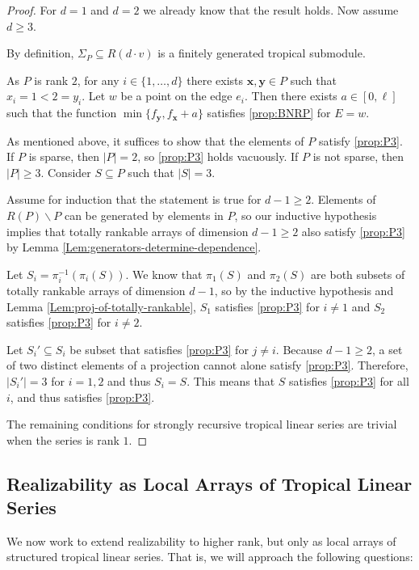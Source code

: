 \documentclass{amsart}
\begin{document}
	\begin{proof}
		For $d=1$ and $d=2$ we already know that the result holds. Now assume $d \geq 3$.
		
		By definition, $\Sigma_P \subseteq R(d \cdot v)$ is a finitely generated tropical submodule. 
		
		As $P$ is rank $2$, for any $i \in \{ 1, \ldots, d \}$ there exists $\mathbf{x}, \mathbf{y} \in P$ such that $x_i = 1 < 2 = y_i$. Let $w$ be a point on the edge $e_i$. Then there exists $a \in [0, \ell]$ such that the function $\min \{ f_{\mathbf{y}}, f_{\mathbf{x}} + a \}$ satisfies \ref{prop:BNRP} for $E = w$.
		
		As mentioned above, it suffices to show that the elements of $P$ satisfy \ref{prop:P3}. If $P$ is sparse, then $|P| = 2$, so \ref{prop:P3} holds vacuously. If $P$ is not sparse, then $|P| \geq 3$. Consider $S \subseteq P$ such that $|S| = 3$.
		
		Assume for induction that the statement is true for $d-1 \geq 2$. Elements of $R(P) \backslash P$ can be generated by elements in $P$, so our inductive hypothesis implies that totally rankable arrays of dimension $d-1 \geq 2$ also satisfy \ref{prop:P3} by Lemma \ref{Lem:generators-determine-dependence}.
		
		Let $S_i = \pi_i^{-1}(\pi_i(S))$. We know that $\pi_1(S)$ and $\pi_2(S)$ are both subsets of totally rankable arrays of dimension $d-1$, so by the inductive hypothesis and Lemma \ref{Lem:proj-of-totally-rankable}, $S_1$ satisfies \ref{prop:P3} for $i \neq 1$ and $S_2$ satisfies \ref{prop:P3} for $i \neq 2$. 
		
		Let $S_i' \subseteq S_i$ be subset that satisfies \ref{prop:P3} for $j \neq i$. Because $d-1 \geq 2$, a set of two distinct elements of a projection cannot alone satisfy \ref{prop:P3}. Therefore, $|S_i'| = 3$ for $i=1,2$ and thus $S_i = S$. This means that $S$ satisfies \ref{prop:P3} for all $i$, and thus satisfies \ref{prop:P3}.
		
		The remaining conditions for strongly recursive tropical linear series are trivial when the series is rank $1$.
	\end{proof}
	
	\subsection{Realizability as Local Arrays of Tropical Linear Series}
	\label{Subsec:real-by-tls}
	
	We now work to extend realizability to higher rank, but only as local arrays of structured tropical linear series. That is, we will approach the following questions:
	
\end{document}
